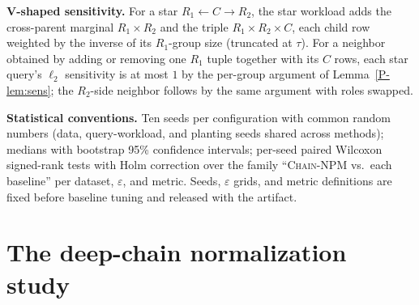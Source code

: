\documentclass[sigconf, nonacm]{acmart}
\newcommand{\chainnpm}{\textsc{Chain-NPM}\xspace}
\newcommand{\pref}[1]{\ref{P-#1}}
\begin{document}
\textbf{V-shaped sensitivity.} For a star $R_1{\leftarrow}C{\to}R_2$, the
star workload adds the cross-parent marginal $R_1{\times}R_2$ and the
triple $R_1{\times}R_2{\times}C$, each child row weighted by the inverse
of its $R_1$-group size (truncated at $\tau$). For a neighbor obtained by
adding or removing one $R_1$ tuple together with its $C$ rows, each star
query's $\ell_2$ sensitivity is at most $1$ by the per-group argument of
Lemma~\pref{lem:sens}; the $R_2$-side neighbor follows by the same
argument with roles swapped.

\textbf{Statistical conventions.} Ten seeds per configuration with common
random numbers (data, query-workload, and planting seeds shared across
methods); medians with bootstrap 95\% confidence intervals; per-seed
paired Wilcoxon signed-rank tests with Holm correction over the family
``\chainnpm{} vs.\ each baseline'' per dataset, $\varepsilon$, and metric.
Seeds,
$\varepsilon$ grids, and metric definitions are fixed before baseline
tuning and released with the artifact.

\section{The deep-chain normalization study}
\label{app:normalization}
\end{document}
